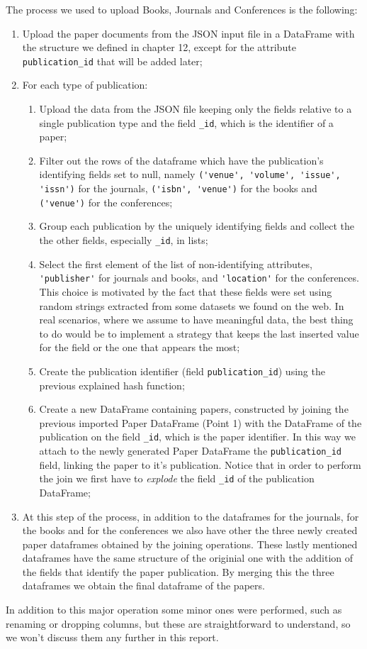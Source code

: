 The process we used to upload Books, Journals and Conferences is the following:
\begin{enumerate}
    \item Upload the paper documents from the JSON input file in a DataFrame with the structure we defined in chapter 12, except for the attribute \verb|publication_id| that will be added later;
    \item For each type of publication:
    \begin{enumerate}
        \item Upload the data from the JSON file keeping only the fields relative to a single publication type and the field \verb|_id|, which is the identifier of a paper;
        \item Filter out the rows of the dataframe which have the publication's identifying fields set to null, namely \verb|('venue', 'volume', 'issue', 'issn')| for the journals, \verb|('isbn', 'venue')| for the books and \verb|('venue')| for the conferences;
        \item Group each publication by the uniquely identifying fields and collect the the other fields, especially \verb|_id|, in lists;
        \item Select the first element of the list of non-identifying attributes, \verb|'publisher'| for journals and books, and \verb|'location'| for the conferences.
        This choice is motivated by the fact that these fields were set using random strings extracted from some datasets we found on the web.
        In real scenarios, where we assume to have meaningful data, the best thing to do would be to implement a strategy that keeps the last inserted value for the field or the one that appears the most;
        \item Create the publication identifier (field \verb|publication_id|) using the previous explained hash function;
        \item Create a new DataFrame containing papers, constructed by joining the previous imported Paper DataFrame (Point 1) with the DataFrame of the publication on the field \verb|_id|, which is the paper identifier.
        In this way we attach to the newly generated Paper DataFrame the \verb|publication_id| field, linking the paper to it's publication.
        Notice that in order to perform the join we first have to \textit{explode} the field \verb|_id| of the publication DataFrame;
    \end{enumerate}
    \item At this step of the process, in addition to the dataframes for the journals, for the books and for the conferences we also have other the three newly created paper dataframes obtained by the joining operations.
    These lastly mentioned dataframes have the same structure of the originial one with the addition of the fields that identify the paper publication.
    By merging this the three dataframes we obtain the final dataframe of the papers.
\end{enumerate}
In addition to this major operation some minor ones were performed, such as renaming or dropping columns, but these are straightforward to understand, so we won't discuss them any further in this report.


